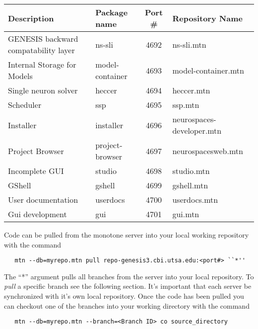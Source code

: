 \documentclass[12pt]{article}
\begin{document}
\vspace{3mm}
\begin{footnotesize}
\begin{centering}
\begin{tabular}{| l | l | c | l |}
\hline
{\bf Description}                                               & {\bf Package name}   & {\bf Port \#} & {\bf Repository Name} \\ \hline
GENESIS backward compatability layer    & ns-sli           & 4692           & ns-sli.mtn \\ \hline
Internal Storage for Models                           & model-container        & 4693           & model-container.mtn \\ \hline
Single neuron solver                                      & heccer 	                        & 4694           & heccer.mtn \\ \hline
Scheduler                                                         & ssp                                & 4695           & ssp.mtn \\ \hline
Installer                                                             & installer                        & 4696           & neurospaces-developer.mtn \\ \hline
Project Browser                                               & project-browser          & 4697           & neurospacesweb.mtn \\ \hline
Incomplete GUI 	                                      & studio                            & 4698           & studio.mtn \\ \hline
GShell 	                                                         & gshell                            & 4699          & gshell.mtn \\ \hline
User documentation                                       & userdocs                      & 4700          & userdocs.mtn \\ \hline
Gui development                                             & gui                                 & 4701          & gui.mtn \\ \hline
\end{tabular}
\end{centering}
\end{footnotesize}

\noindent Code can be pulled from the monotone server into your local working repository with the command
\begin{verbatim}
   mtn --db=myrepo.mtn pull repo-genesis3.cbi.utsa.edu:<port#> ``*''
\end{verbatim}
The ``*'' argument pulls all branches from the server into your local repository. To {\it pull} a specific branch see the following section. It's important that each server be synchronized with it's own local repository. Once the code has been pulled you can checkout one of the branches into your working directory with the command
\begin{verbatim}
   mtn --db=myrepo.mtn --branch=<Branch ID> co source_directory 
\end{verbatim}
\end{document}
